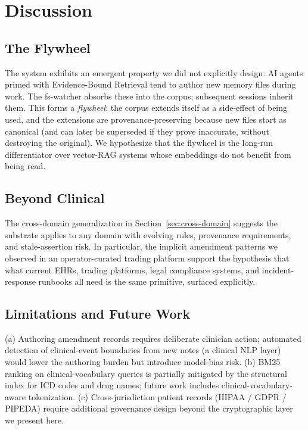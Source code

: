 \documentclass[runningheads]{llncs}
\begin{document}
\section{Discussion}
\label{sec:discussion}

\subsection{The Flywheel}

The system exhibits an emergent property we did not explicitly design: AI
agents primed with Evidence-Bound Retrieval tend to author new memory
files during work. The fs-watcher absorbs these into the corpus; subsequent
sessions inherit them. This forms a \emph{flywheel}: the corpus extends
itself as a side-effect of being used, and the extensions are
provenance-preserving because new files start as canonical (and can later
be superseded if they prove inaccurate, without destroying the original).
We hypothesize that the flywheel is the long-run differentiator over
vector-RAG systems whose embeddings do not benefit from being read.

\subsection{Beyond Clinical}

The cross-domain generalization in Section~\ref{sec:cross-domain} suggests
the substrate applies to any domain with evolving rules, provenance
requirements, and stale-assertion risk. In particular, the implicit
amendment patterns we observed in an operator-curated trading platform
support the hypothesis that what current EHRs, trading platforms, legal
compliance systems, and incident-response runbooks all need is the same
primitive, surfaced explicitly.

\subsection{Limitations and Future Work}

(a) Authoring amendment records requires deliberate clinician action;
automated detection of clinical-event boundaries from new notes (a clinical
NLP layer) would lower the authoring burden but introduce model-bias risk.
(b) BM25 ranking on clinical-vocabulary queries is partially mitigated by
the structural index for ICD codes and drug names; future work includes
clinical-vocabulary-aware tokenization. (c) Cross-jurisdiction patient
records (HIPAA / GDPR / PIPEDA) require additional governance design
beyond the cryptographic layer we present here.
\end{document}
